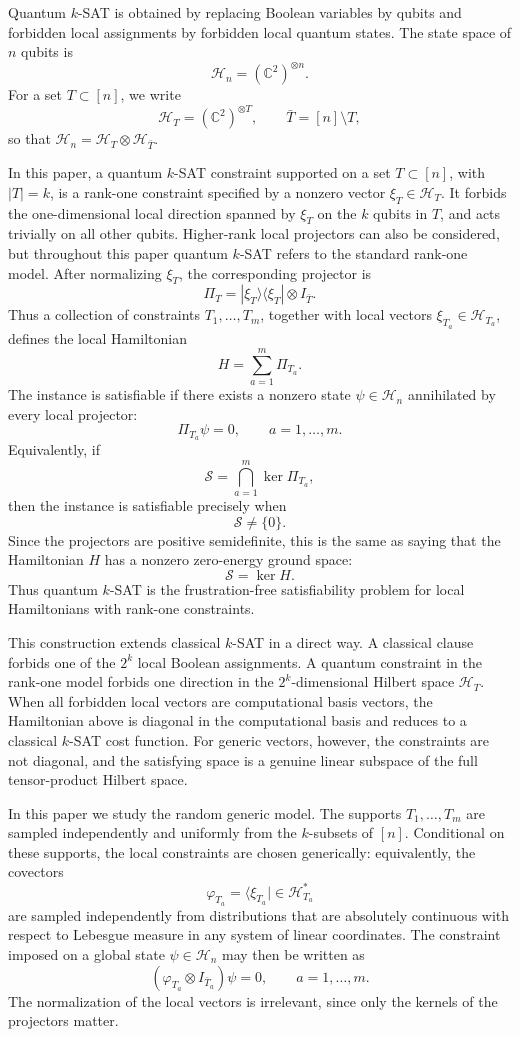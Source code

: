 \documentclass[11pt]{article}
\begin{document}
Quantum \(k\)-SAT is obtained by replacing Boolean variables by qubits and
forbidden local assignments by forbidden local quantum states.  The state space
of \(n\) qubits is
\[
\mathcal H_n = (\mathbb C^2)^{\otimes n}.
\]
For a set \(T\subset[n]\), we write
\[
\mathcal H_T = (\mathbb C^2)^{\otimes T},
\qquad
\bar T=[n]\setminus T,
\]
so that \(\mathcal H_n=\mathcal H_T\otimes\mathcal H_{\bar T}\).

In this paper, a quantum \(k\)-SAT constraint supported on a set
\(T\subset[n]\), with \(|T|=k\), is a rank-one constraint specified by a
nonzero vector \(\xi_T\in\mathcal H_T\).  It forbids the one-dimensional
local direction spanned by \(\xi_T\) on the \(k\) qubits in \(T\), and acts
trivially on all other qubits.  Higher-rank local projectors can also be
considered, but throughout this paper quantum \(k\)-SAT refers to the
standard rank-one model.  After normalizing \(\xi_T\), the corresponding
projector is
\[
\Pi_T = |\xi_T\rangle\langle \xi_T|\otimes I_{\bar T}.
\]
Thus a collection of constraints \(T_1,\ldots,T_m\), together with local
vectors \(\xi_{T_a}\in\mathcal H_{T_a}\), defines the local Hamiltonian
\[
H = \sum_{a=1}^m \Pi_{T_a}.
\]
The instance is satisfiable if there exists a nonzero state
\(\psi\in\mathcal H_n\) annihilated by every local projector:
\[
\Pi_{T_a}\psi=0,
\qquad a=1,\ldots,m.
\]
Equivalently, if
\[
\mathcal S
=
\bigcap_{a=1}^m \ker \Pi_{T_a},
\]
then the instance is satisfiable precisely when
\[
\mathcal S\neq\{0\}.
\]
Since the projectors are positive semidefinite, this is the same as saying that
the Hamiltonian \(H\) has a nonzero zero-energy ground space:
\[
\mathcal S=\ker H .
\]
Thus quantum \(k\)-SAT is the frustration-free satisfiability problem for
local Hamiltonians with rank-one constraints.

This construction extends classical \(k\)-SAT in a direct way.  A classical
clause forbids one of the \(2^k\) local Boolean assignments.  A quantum
constraint in the rank-one model forbids one direction in the
\(2^k\)-dimensional Hilbert space \(\mathcal H_T\).  When all forbidden local vectors are computational
basis vectors, the Hamiltonian above is diagonal in the computational basis and
reduces to a classical \(k\)-SAT cost function.  For generic vectors, however,
the constraints are not diagonal, and the satisfying space is a genuine linear
subspace of the full tensor-product Hilbert space.

In this paper we study the random generic model.  The supports
\(T_1,\ldots,T_m\) are sampled independently and uniformly from the
\(k\)-subsets of \([n]\).  Conditional on these supports, the local constraints
are chosen generically: equivalently, the covectors
\[
\varphi_{T_a}=\langle \xi_{T_a}|
\in \mathcal H_{T_a}^*
\]
are sampled independently from distributions that are absolutely continuous
with respect to Lebesgue measure in any system of linear coordinates.  The
constraint imposed on a global state \(\psi\in\mathcal H_n\) may then be
written as
\[
(\varphi_{T_a}\otimes I_{\bar T_a})\psi=0,
\qquad a=1,\ldots,m .
\]
The normalization of the local vectors is irrelevant, since only the kernels of
the projectors matter.
\end{document}
